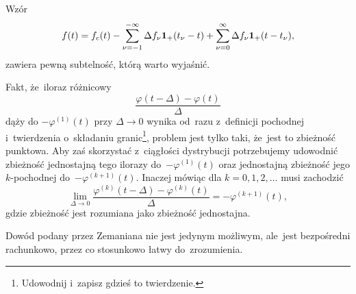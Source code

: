 \documentclass[a4paper,11pt]{article}
\begin{document}
\start {}

\vspace{\spaceFour}



\start {}

\vspace{\spaceFour}



\start {} Wzór
\begin{equation}
  \label{eq:Zem-s01-07}
  f( t ) =
  f_{ c }( t )
  - \sum_{ \nu = -1 }^{ -\infty } \Delta f_{ \nu } \mathbf{1}_{ + }( t_{ \nu } - t )
  + \sum_{ \nu = 0 }^{ \infty } \Delta f_{ \nu } \mathbf{1}_{ + }( t - t_{ \nu } ),
\end{equation}
zawiera pewną subtelność, którą warto wyjaśnić. \Dok

\vspace{\spaceFour}



\start {} Fakt, że~iloraz różnicowy
\begin{equation}
  \label{eq:Zem-s01-08}
  \frac{ \varphi( t - \Delta ) - \varphi( t ) }{ \Delta }
\end{equation}
dąży do $-\varphi^{ ( 1 ) }( t )$ przy $\Delta \to 0$ wynika od~razu z~definicji
pochodnej i~twierdzenia o~składaniu granic\footnote{Udowodnij i~zapisz
  gdzieś to twierdzenie.}, problem jest tylko taki, że~jest to
zbieżność punktowa. Aby zaś skorzystać z~ciągłości dystrybucji
potrzebujemy udowodnić zbieżność jednostajną tego ilorazy
do~$-\varphi^{ ( 1 ) }( t )$ oraz jednostajną zbieżność jego $k$-pochodnej
do~$-\varphi^{ ( k + 1 ) }( t )$. Inaczej mówiąc dla $k = 0, 1, 2, \ldots$
musi zachodzić
\begin{equation}
  \label{eq:Zem-s01-09}
  \lim_{ \Delta \to 0 }
  \frac{ \varphi^{ ( k ) }( t - \Delta ) - \varphi^{ ( k ) }( t ) }{ \Delta }
  = -\varphi^{ ( k + 1 ) }( t ),
\end{equation}
gdzie zbieżność jest rozumiana jako zbieżność jednostajna.

Dowód podany przez Zemaniana nie jest jedynym możliwym, ale~jest
bezpośredni rachunkowo, przez co stosunkowo łatwy do~zrozumienia.





\end{document}
